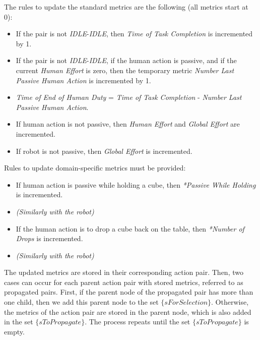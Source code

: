 The rules to update the standard metrics are the following (all metrics start at 0):
\vspace{-\topsep}
\begin{itemize}
    \setlength\itemsep{-0.3em}
    \item If the pair is not \textit{IDLE}-\textit{IDLE}, then \textit{Time of Task Completion} is incremented by 1.
    \item If the pair is not \textit{IDLE}-\textit{IDLE}, if the human action is passive, and if the current \textit{Human Effort} is zero, then the temporary metric \textit{Number Last Passive Human Action} is incremented by 1.
    \item \textit{Time of End of Human Duty} = \textit{Time of Task Completion} - \textit{Number Last Passive Human Action}.
    \item If human action is not passive, then \textit{Human Effort} and \textit{Global Effort} are incremented.
    \item If robot is not passive, then \textit{Global Effort} is incremented.
\end{itemize}
Rules to update domain-specific metrics must be provided:
\vspace{-\topsep}
\begin{itemize}
    \setlength\itemsep{-0.3em}
    \item If human action is passive while holding a cube, then \textit{*Passive While Holding} is incremented.
    \item \textit{(Similarly with the robot)}
    \item If the human action is to drop a cube back on the table, then \textit{*Number of Drops} is incremented.
    \item \textit{(Similarly with the robot)}
\end{itemize}

The updated metrics are stored in their corresponding action pair. Then, two cases can occur for each parent action pair with stored metrics, referred to as propagated pairs. First, if the parent node of the propagated pair has more than one child, then we add this parent node to the set $\{sForSelection\}$. Otherwise, the metrics of the action pair are stored in the parent node, which is also added in the set $\{sToPropagate\}$. 
The process repeats until the set $\{sToPropagate\}$ is empty.

